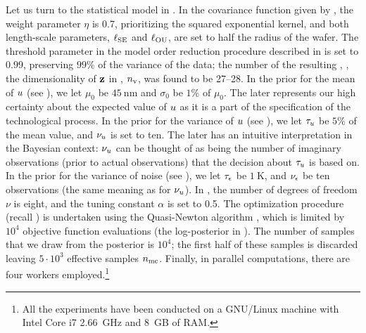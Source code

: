 Let us turn to the statistical model in . In the covariance function given by , the weight parameter $\eta$ is 0.7, prioritizing the squared exponential kernel, and both length-scale parameters, $\ell_{\text{SE}}$ and $\ell_{\text{OU}}$, are set to half the radius of the wafer. The threshold parameter in the model order reduction procedure described in  is set to $0.99$, preserving $99\%$ of the variance of the data; the number of the resulting \rvs, \ie, the dimensionality of $\mathbf{z}$ in , ${n_\text{v}}$, was found to be 27--28.
In the prior for the mean of $u$ (see ), we let $\mu_0$ be $45~\text{nm}$ and $\sigma_0$ be $1\%$ of $\mu_0$. The later represents our high certainty about the expected value of $u$ as it is a part of the specification of the technological process.
In the prior for the variance of $u$ (see ), we let $\tau_u$ be $5\%$ of the mean value, and $\nu_u$ is set to ten. The later has an intuitive interpretation in the Bayesian context: $\nu_u$ can be thought of as being the number of imaginary observations (prior to actual observations) that the decision about $\tau_u$ is based on.
In the prior for the variance of noise (see ), we let $\tau_\epsilon$ be $1~\text{K}$, and $\nu_\epsilon$ be ten observations (the same meaning as for $\nu_u$).
In , the number of degrees of freedom $\nu$ is eight, and the tuning constant $\alpha$ is set to 0.5.
The optimization procedure (recall ) is undertaken using the Quasi-Newton algorithm \cite{press2007}, which is limited by $10^4$ objective function evaluations (the log-posterior in ).
The number of samples that we draw from the posterior is $10^4$; the first half of these samples is discarded leaving $5 \cdot 10^3$ effective samples ${n_\text{mc}}$.
Finally, in parallel computations, there are four workers employed.\footnote{All the experiments have been conducted on a GNU/Linux machine with Intel Core i7 2.66~GHz and 8~GB of RAM.}

